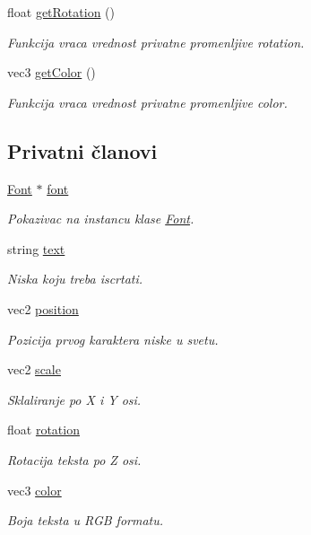 \begin{DoxyCompactItemize}
float \hyperlink{classfont_1_1Text_a5e59176805cd037ae0c528b84703961c}{get\+Rotation} ()
\begin{DoxyCompactList}\small\item\em Funkcija vraca vrednost privatne promenljive rotation. \end{DoxyCompactList}\item 
vec3 \hyperlink{classfont_1_1Text_ae947a015d868f5750e28b10010b0cb9d}{get\+Color} ()
\begin{DoxyCompactList}\small\item\em Funkcija vraca vrednost privatne promenljive color. \end{DoxyCompactList}\end{DoxyCompactItemize}
\subsection*{Privatni članovi}
\begin{DoxyCompactItemize}
\item 
\hyperlink{classfont_1_1Font}{Font} $\ast$ \hyperlink{classfont_1_1Text_abcaa4524d10d18e780ff793cca49a168}{font}
\begin{DoxyCompactList}\small\item\em Pokazivac na instancu klase \hyperlink{classfont_1_1Font}{Font}. \end{DoxyCompactList}\item 
string \hyperlink{classfont_1_1Text_aee63974ff23d9e971bbd04fe041ccb07}{text}
\begin{DoxyCompactList}\small\item\em Niska koju treba iscrtati. \end{DoxyCompactList}\item 
vec2 \hyperlink{classfont_1_1Text_a65489ce0d1c13aaf242804987dba8b8d}{position}
\begin{DoxyCompactList}\small\item\em Pozicija prvog karaktera niske u svetu. \end{DoxyCompactList}\item 
vec2 \hyperlink{classfont_1_1Text_aec4f985d466d9f4b10cc426e393d6f14}{scale}
\begin{DoxyCompactList}\small\item\em Sklaliranje po X i Y osi. \end{DoxyCompactList}\item 
float \hyperlink{classfont_1_1Text_a4dc0a823fa5a8592b6d09e90b18226fb}{rotation}
\begin{DoxyCompactList}\small\item\em Rotacija teksta po Z osi. \end{DoxyCompactList}\item 
vec3 \hyperlink{classfont_1_1Text_a83c69eadc420a466aaade60393f35b24}{color}
\begin{DoxyCompactList}\small\item\em Boja teksta u R\+GB formatu. \end{DoxyCompactList}\end{DoxyCompactItemize}


